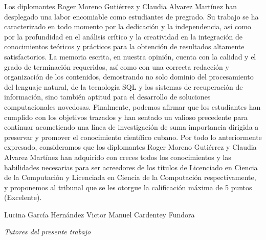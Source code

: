 \begin{opinion}
    Los diplomantes Roger Moreno Gutiérrez y Claudia Alvarez Martínez han desplegado una labor
encomiable como estudiantes de pregrado. Su trabajo se ha caracterizado en todo momento por la dedicación y la independencia, así como por
la profundidad en el análisis crítico y la creatividad en la integración de conocimientos teóricos y prácticos para la obtención de resultados altamente
satisfactorios. La memoria escrita, en nuestra opinión, cuenta con la calidad
y el grado de terminación requeridos, así como con una correcta redacción
y organización de los contenidos, demostrando no solo dominio del procesamiento del lenguaje natural,
de la tecnología SQL y los sistemas de recuperación de información,
sino también aptitud para el desarrollo de soluciones computacionales novedosas. 
Finalmente, podemos afirmar que los estudiantes han cumplido con
los objetivos trazados y han sentado un valioso precedente para continuar
acometiendo una línea de investigación de suma importancia dirigida a preservar y
promover el conocimiento científico cubano.
Por todo lo anteriormente expresado, consideramos que los diplomantes
Roger Moreno Gutiérrez y Claudia Alvarez Martínez  han adquirido con creces todos los conocimientos y
las habilidades necesarias para  ser acreedores de los títulos de Licenciado
en Ciencia de la Computación y Licenciada en Ciencia de la Computación respectivamente, y proponemos al tribunal que se les otorgue
la calificación máxima de 5 puntos (Excelente).

\vspace{20mm}
\centering
Lucina García Hernández \hspace{10mm}  Victor Manuel Cardentey Fundora

\begin{center}
    \textit{Tutores del presente trabajo}
\end{center}

\end{opinion}

